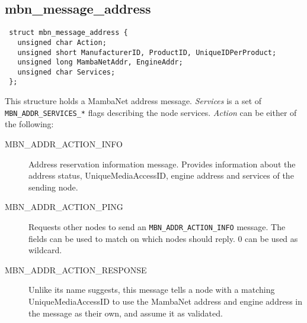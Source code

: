 \documentclass[a4paper]{report}
\begin{document}
\subsection{mbn\_message\_address}
\begin{verbatim}
 struct mbn_message_address {
   unsigned char Action;
   unsigned short ManufacturerID, ProductID, UniqueIDPerProduct;
   unsigned long MambaNetAddr, EngineAddr;
   unsigned char Services;
 };
\end{verbatim}
This structure holds a MambaNet address message. \textit{Services} is a set of \verb|MBN_ADDR_SERVICES_*| flags describing the node services. \textit{Action} can be either of the following:
\begin{description}
 \item[MBN\_ADDR\_ACTION\_INFO]
  Address reservation information message. Provides information about the address status, UniqueMediaAccessID, engine address and services of the sending node.
 \item[MBN\_ADDR\_ACTION\_PING]
  Requests other nodes to send an \verb|MBN_ADDR_ACTION_INFO| message. The fields can be used to match on which nodes should reply. 0 can be used as wildcard.
 \item[MBN\_ADDR\_ACTION\_RESPONSE]
  Unlike its name suggests, this message tells a node with a matching UniqueMediaAccessID to use the MambaNet address and engine address in the message as their own, and assume it as validated.
\end{description}
\end{document}
